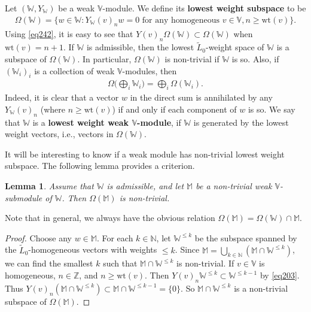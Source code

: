 \documentclass[12pt,a4paper,notitlepage]{report}
\theoremstyle{definition}
\theoremstyle{plain}
\newtheorem{lm}[df]{Lemma}
\newcommand{\wtd}{\widetilde}
\newcommand{\Vbb}{\mathbb V}
\newcommand{\Wbb}{\mathbb W}
\newcommand{\Mbb}{\mathbb M}
\newcommand{\Nbb}{\mathbb N}
\newcommand{\Zbb}{\mathbb Z}
\newcommand{\wt}{\mathrm{wt}}
\numberwithin{equation}{section}
\begin{document}
Let $(\Wbb,Y_\Wbb)$ be a weak $\Vbb$-module. We define its \textbf{lowest weight subspace} to be \index{zz@$\Omega(\Wbb),\Omega_{+-}(\Wbb)$}
\begin{align*}
\Omega(\Wbb)=\{w\in\Wbb:Y_\Wbb(v)_nw=0\text{ for any homogeneous }v\in\Vbb,n\geq \wt(v)\}.
\end{align*}
Using \eqref{eq242}, it is easy to see that $Y(v)_n\Omega(\Wbb)\subset\Omega(\Wbb)$ when $\wt(v)=n+1$.  If $\Wbb$ is admissible, then the lowest $\wtd L_0$-weight space of $\Wbb$ is a subspace of $\Omega(\Wbb)$. In particular, $\Omega(\Wbb)$ is non-trivial if $\Wbb$ is so. Also, if $(\Wbb_i)_i$ is a collection of weak $\Vbb$-modules, then
\begin{align}
\Omega\Big(\bigoplus_i \Wbb_i\Big)=\bigoplus_i\Omega(\Wbb_i).\label{eq205}
\end{align}
Indeed, it is clear that a vector $w$ in the direct sum is annihilated by any $Y_\Wbb(v)_n$ (where $n\geq\wt(v)$) if and only if each component of $w$ is so. We say that $\Wbb$ is a \textbf{lowest weight weak $\Vbb$-module}, if $\Wbb$ is generated by the lowest weight vectors, i.e., vectors in $\Omega(\Wbb)$.


It will be interesting to know if a weak module has non-trivial lowest weight subspace. The following lemma provides a criterion.

\begin{lm}\label{lb96}
Assume that $\Wbb$ is admissible, and let $\Mbb$ be a non-trivial weak $\Vbb$-submodule of $\Wbb$. Then $\Omega(\Mbb)$ is non-trivial.
\end{lm}

Note that in general, we always have the obvious relation $\Omega(\Mbb)=\Omega(\Wbb)\cap \Mbb$.


\begin{proof}
Choose any $w\in\Mbb$. For each $k\in\Nbb$, let $\Wbb^{\leq k}$ be the subspace spanned by the $\wtd L_0$-homogeneous vectors with weights $\leq k$. Since $\Mbb=\bigcup_{k\in\Nbb}(\Mbb\cap\Wbb^{\leq k})$, we can find the smallest $k$ such that $\Mbb\cap\Wbb^{\leq k}$ is non-trivial. If $v\in\Vbb$ is homogeneous, $n\in\Zbb$, and $n\geq\wt(v)$. Then $Y(v)_n\Wbb^{\leq k}\subset\Wbb^{\leq k-1}$ by \eqref{eq203}. Thus $Y(v)_n(\Mbb\cap\Wbb^{\leq k})\subset\Mbb\cap\Wbb^{\leq k-1}=\{0\}$. So $\Mbb\cap\Wbb^{\leq k}$ is a non-trivial subspace of $\Omega(\Mbb)$.
\end{proof}
\end{document}
